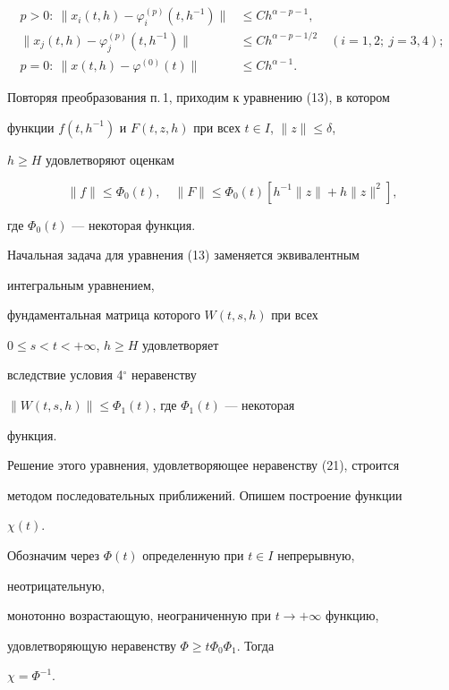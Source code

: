 \begin{thm}
\begin{equation}
\begin{split} 


p>0: \ \|x_i(t,h)-\varphi^{(p)}_i(t,h^{-1})\| &\le 


C h^{\alpha-p-1}, \\ 


\|x_j(t,h)-\varphi^{(p)}_j(t,h^{-1})\| &\le  


C h^{\alpha-p-1/2}\quad (i=1,2; \ j=3,4); \\ 


p=0: \ \|x(t,h)-\varphi^{(0)}(t)\| &\le C h^{\alpha-1}. 


\end{split} 


\end{equation} 


\end{thm} 


 


\begin{pf} 


Повторяя преобразования п.\,1, приходим к уравнению (13), в котором 


функции $f(t,h^{-1})$ и $F(t,z,h)$ при всех $t\in I$, $\|z\|\le\delta$, 


$h\ge H$ удовлетворяют оценкам 


$$ 


\|f\|\le\Phi_0(t),\quad 


\|F\|\le\Phi_0(t)[h^{-1}\|z\|+h\|z\|^2], 


$$ 


где $\Phi_0(t)$ --- некоторая функция. 


 


Начальная задача для уравнения (13) заменяется эквивалентным


интегральным уравнением, 


фундаментальная матрица которого $W(t,s,h)$ при всех 


$0\le s<t<+\infty$, $h\ge H$ удовлетворяет 


вследствие условия 4${}^\circ$ неравенству 


$\|W(t,s,h)\|\le\Phi_1(t)$, где $\Phi_1(t)$ --- некоторая 


функция. 


 


Решение этого уравнения, удовлетворяющее неравенству (21), строится 


методом последовательных приближений. Опишем построение функции 


$\chi(t)$. 


Обозначим через $\Phi(t)$ определенную при $t\in I$ непрерывную, 


неотрицательную, 


монотонно возрастающую, неограниченную при $t\to+\infty$ функцию, 


удовлетворяющую неравенству $\Phi\ge t\Phi_0\Phi_1$. Тогда 


$\chi=\Phi^{-1}$. 


\end{pf} 


